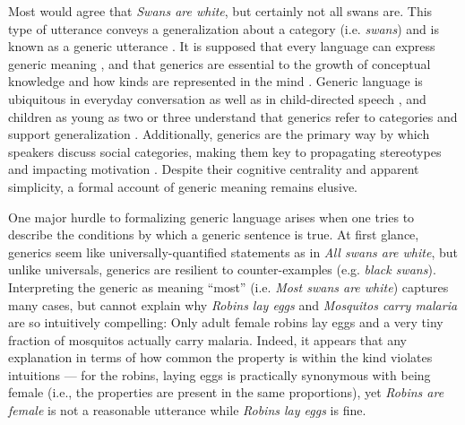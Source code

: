 \documentclass[10pt,letterpaper]{article}
\begin{document}
Most would agree that \emph{Swans are white}, but certainly not all swans are.
This type of utterance conveys a generalization about a category (i.e. \emph{swans}) and is known as a generic utterance \cite{Carlson1977, Leslie2008}.
It is supposed that every language can express generic meaning \cite{Behrens2005, Carlson1995}, and that generics are essential to the growth of conceptual knowledge \cite{Gelman2004} and how kinds are represented in the mind \cite{Leslie2008}.
Generic language is ubiquitous in everyday conversation as well as in child-directed speech \cite{Gelman2008}, and children as young as two or three understand that generics refer to categories and support generalization \cite{Cimpian2008}.
Additionally, generics are the primary way by which speakers discuss social categories, making them key to propagating stereotypes \cite{GelmanEtAl2004, Rhodes2012, Leslie2015} and impacting motivation \cite{Cimpian2010motivation}.
Despite their cognitive centrality and apparent simplicity, a formal account of generic meaning remains elusive.

One major hurdle to formalizing generic language arises when one tries to describe the conditions by which a generic sentence is true.
At first glance, generics seem like universally-quantified statements as in \emph{All swans are white}, but unlike universals, generics are resilient to counter-examples (e.g. \emph{black swans}). 
Interpreting the generic as meaning ``most'' (i.e. \emph{Most swans are white}) captures many cases, but cannot explain why \emph{Robins lay eggs} and \emph{Mosquitos carry malaria} are so intuitively compelling: Only adult female robins lay eggs and a very tiny fraction of mosquitos actually carry malaria.
Indeed, it appears that any explanation in terms of how common the property is within the kind violates intuitions --- for the robins, laying eggs is practically synonymous with being female (i.e., the properties are present in the same proportions), yet \emph{Robins are female} is not a reasonable utterance while \emph{Robins lay eggs} is fine.
\end{document}
